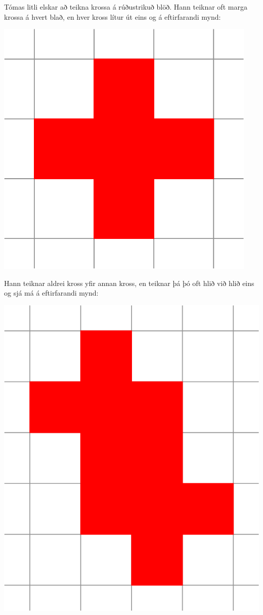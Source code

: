 
Tómas litli elskar að teikna krossa á rúðustrikuð blöð. Hann teiknar oft marga
krossa á hvert blað, en hver kross lítur út eins og á eftirfarandi mynd:

\includegraphics[scale=0.4]{cross.png}

Hann teiknar aldrei kross yfir annan kross, en teiknar þá þó oft hlið við hlið
eins og sjá má á eftirfarandi mynd:

\includegraphics[scale=0.4]{two_crosses.png}

